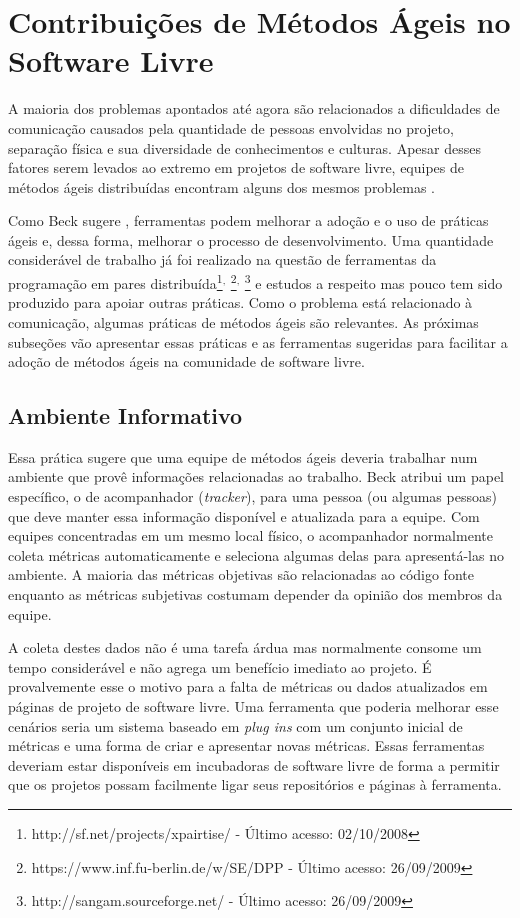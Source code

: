\section{Contribuições de Métodos Ágeis no Software Livre}
\label{sec:agile-improve-os}

A maioria dos problemas apontados até agora são relacionados a
dificuldades de comunicação causados pela quantidade de pessoas
envolvidas no projeto, separação física e sua diversidade de
conhecimentos e culturas. Apesar desses fatores serem levados ao
extremo em projetos de software livre, equipes de métodos ágeis
distribuídas encontram alguns dos mesmos problemas
\cite{Sutherland2007,Maurer2002}.

Como Beck sugere \cite{Beck2008}, ferramentas podem melhorar a adoção
e o uso de práticas ágeis e, dessa forma, melhorar o processo de
desenvolvimento. Uma quantidade considerável de trabalho já foi
realizado na questão de ferramentas da programação em pares
distribuída\footnote{http://sf.net/projects/xpairtise/ - Último
  acesso: 02/10/2008}$^{,}$
\footnote{https://www.inf.fu-berlin.de/w/SE/DPP - Último acesso:
  26/09/2009}$^{,}$ \footnote{http://sangam.sourceforge.net/ - Último
  acesso: 26/09/2009} e estudos a respeito \cite{Nagappan2003} mas
pouco tem sido produzido para apoiar outras práticas. Como o problema
está relacionado à comunicação, algumas práticas de métodos ágeis são
relevantes. As próximas subseções vão apresentar essas práticas e as
ferramentas sugeridas para facilitar a adoção de métodos ágeis na
comunidade de software livre.

\subsection{Ambiente Informativo}
\label{subsec:inform-worksp}

Essa prática sugere que uma equipe de métodos ágeis deveria trabalhar
num ambiente que provê informações relacionadas ao trabalho. Beck
\cite{XP01} atribui um papel específico, o de acompanhador
(\emph{tracker}), para uma pessoa (ou algumas pessoas) que deve manter
essa informação disponível e atualizada para a equipe. Com equipes
concentradas em um mesmo local físico, o acompanhador normalmente
coleta métricas \cite{Sato2007} automaticamente e seleciona algumas
delas para apresentá-las no ambiente. A maioria das métricas objetivas
são relacionadas ao código fonte enquanto as métricas subjetivas
costumam depender da opinião dos membros da equipe.

A coleta destes dados não é uma tarefa árdua mas normalmente consome
um tempo considerável e não agrega um benefício imediato ao projeto. É
provalvemente esse o motivo para a falta de métricas ou dados
atualizados em páginas de projeto de software livre. Uma ferramenta
que poderia melhorar esse cenários seria um sistema baseado em
\emph{plug ins} com um conjunto inicial de métricas e uma forma de
criar e apresentar novas métricas. Essas ferramentas deveriam estar
disponíveis em incubadoras de software livre de forma a permitir que
os projetos possam facilmente ligar seus repositórios e páginas à
ferramenta.

